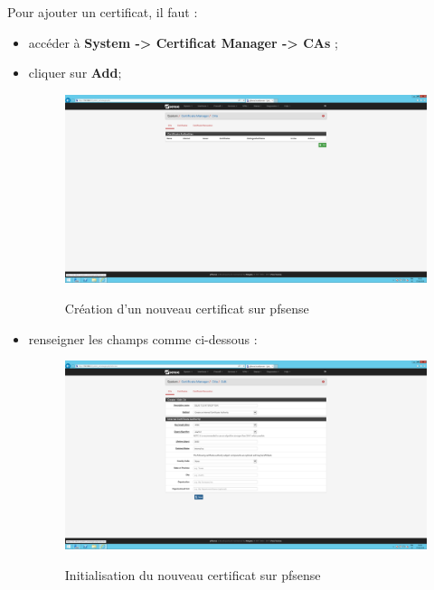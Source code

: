 Pour ajouter un certificat, il faut :
\begin{itemize}
\item accéder à \textbf{System -> Certificat Manager -> CAs} ;

\item cliquer sur \textbf{Add};

\begin{figure}[h!]
    \begin{center}
        \includegraphics[scale=0.20]{Pfsense_Screeshots/interception/9.png}
        \label{Pfsense_Screeshots/interception/9}
        \caption{Création d'un nouveau certificat sur pfsense}
    \end{center}
\end{figure}
\FloatBarrier 
    
\item renseigner les champs comme ci-dessous :
\begin{figure}[h!]
    \begin{center}
        \includegraphics[scale=0.20]{Pfsense_Screeshots/interception/10.png}
        \label{Pfsense_Screeshots/interception/10}
        \caption{Initialisation du nouveau certificat sur pfsense}
    \end{center}
\end{figure}
\FloatBarrier 
\newpage
\end{itemize}
